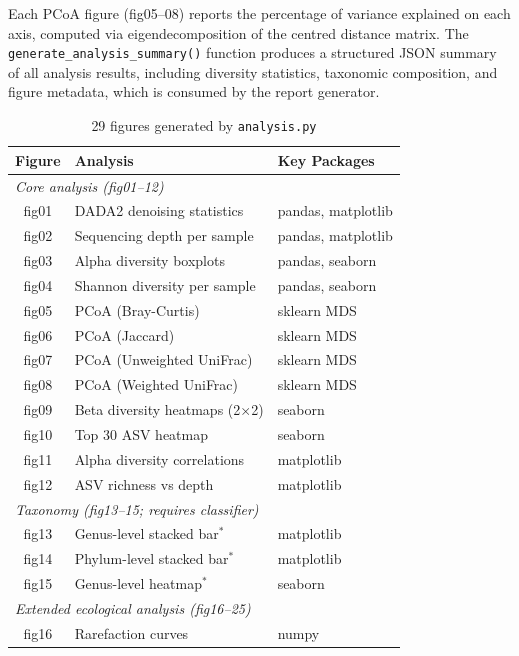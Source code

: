 \documentclass[12pt, a4paper]{article}
\begin{document}
Each PCoA figure (fig05--08) reports the percentage of variance explained
on each axis, computed via eigendecomposition of the centred distance matrix.
The \texttt{generate\_analysis\_summary()} function produces a structured
JSON summary of all analysis results, including diversity statistics,
taxonomic composition, and figure metadata, which is consumed by the
report generator.

\begin{table}[h]
  \centering
  \caption{29 figures generated by \texttt{analysis.py}}
  \label{tab:analysis_figures}
  \begin{tabular}{clp{5.5cm}}
    \toprule
    \textbf{Figure} & \textbf{Analysis} & \textbf{Key Packages} \\
    \midrule
    \multicolumn{3}{l}{\textit{Core analysis (fig01--12)}} \\
    fig01 & DADA2 denoising statistics & pandas, matplotlib \\
    fig02 & Sequencing depth per sample & pandas, matplotlib \\
    fig03 & Alpha diversity boxplots & pandas, seaborn \\
    fig04 & Shannon diversity per sample & pandas, seaborn \\
    fig05 & PCoA (Bray-Curtis) & sklearn MDS \\
    fig06 & PCoA (Jaccard) & sklearn MDS \\
    fig07 & PCoA (Unweighted UniFrac) & sklearn MDS \\
    fig08 & PCoA (Weighted UniFrac) & sklearn MDS \\
    fig09 & Beta diversity heatmaps (2$\times$2) & seaborn \\
    fig10 & Top 30 ASV heatmap & seaborn \\
    fig11 & Alpha diversity correlations & matplotlib \\
    fig12 & ASV richness vs depth & matplotlib \\
    \midrule
    \multicolumn{3}{l}{\textit{Taxonomy (fig13--15; requires classifier)}} \\
    fig13 & Genus-level stacked bar$^*$ & matplotlib \\
    fig14 & Phylum-level stacked bar$^*$ & matplotlib \\
    fig15 & Genus-level heatmap$^*$ & seaborn \\
    \midrule
    \multicolumn{3}{l}{\textit{Extended ecological analysis (fig16--25)}} \\
    fig16 & Rarefaction curves & numpy \\

\end{tabular}
\end{table}
\end{document}
